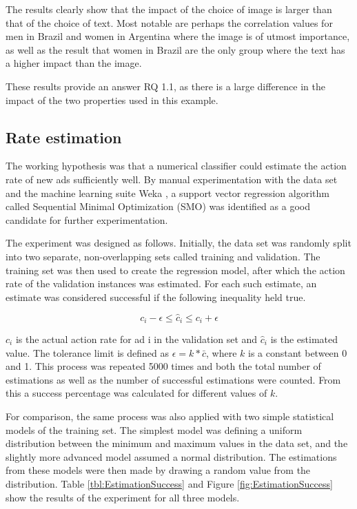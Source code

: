 \documentclass{sig-alternate}
\begin{document}
The results clearly show that the impact of the choice of image is larger than that of the choice of text. Most notable are perhaps the correlation values for men in Brazil and women in Argentina where the image is of utmost importance, as well as the result that women in Brazil are the only group where the text has a higher impact than the image.

These results provide an answer RQ 1.1, as there is a large difference in the impact of the two properties used in this example.

\subsection{Rate estimation}
The working hypothesis was that a numerical classifier could estimate the action rate of new ads sufficiently well. By manual experimentation with the data set and the machine learning suite Weka \citep{Garner1995}, a support vector regression algorithm called Sequential Minimal Optimization (SMO) was identified as a good candidate for further experimentation.

The experiment was designed as follows. Initially, the data set was randomly split into two separate, non-overlapping sets called training and validation. The training set was then used to create the regression model, after which the action rate of the validation instances was estimated. For each such estimate, an estimate was considered successful if the following inequality held true.

\[
	c_i - \epsilon \leq \hat{c}_i \leq c_i + \epsilon
\]

\(c_i\) is the actual action rate for ad i in the validation set and \(\hat{c}_i\) is the estimated value. The tolerance limit is defined as \(\epsilon = k*\bar{c}\), where \(k\) is a constant between 0 and 1. This process was repeated 5000 times and both the total number of estimations as well as the number of successful estimations were counted. From this a success percentage was calculated for different values of \(k\).

For comparison, the same process was also applied with two simple statistical models of the training set. The simplest model was defining a uniform distribution between the minimum and maximum values in the data set, and the slightly more advanced model assumed a normal distribution. The estimations from these models were then made by drawing a random value from the distribution. Table \ref{tbl:EstimationSuccess} and Figure \ref{fig:EstimationSuccess} show the results of the experiment for all three models.
\end{document}
